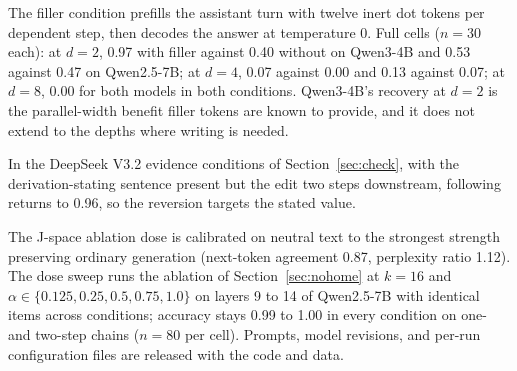 \documentclass{article}
\begin{document}
The filler condition prefills the assistant turn with twelve inert dot tokens per dependent step, then decodes the answer at temperature 0. Full cells ($n=30$ each): at $d=2$, 0.97 with filler against 0.40 without on Qwen3-4B and 0.53 against 0.47 on Qwen2.5-7B; at $d=4$, 0.07 against 0.00 and 0.13 against 0.07; at $d=8$, 0.00 for both models in both conditions. Qwen3-4B's recovery at $d=2$ is the parallel-width benefit filler tokens are known to provide, and it does not extend to the depths where writing is needed.

In the DeepSeek V3.2 evidence conditions of Section~\ref{sec:check}, with the derivation-stating sentence present but the edit two steps downstream, following returns to 0.96, so the reversion targets the stated value.

The J-space ablation dose is calibrated on neutral text to the strongest strength preserving ordinary generation (next-token agreement 0.87, perplexity ratio 1.12). The dose sweep runs the ablation of Section~\ref{sec:nohome} at $k=16$ and $\alpha \in \{0.125, 0.25, 0.5, 0.75, 1.0\}$ on layers 9 to 14 of Qwen2.5-7B with identical items across conditions; accuracy stays 0.99 to 1.00 in every condition on one- and two-step chains ($n=80$ per cell). Prompts, model revisions, and per-run configuration files are released with the code and data.
\end{document}
